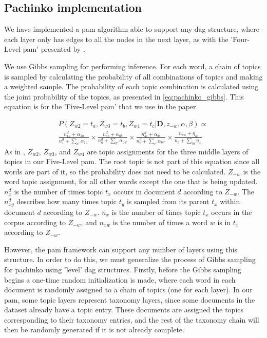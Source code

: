 \subsection{Pachinko implementation}
We have implemented a \acrfull{pam} algorithm able to support any \gls{dag} structure, where each layer only has edges to all the nodes in the next layer, as with the 'Four-Level \gls{pam}' presented by \citet{li2006pachinko}.

We use Gibbs sampling for performing inference.
For each word, a chain of topics is sampled by calculating the probability of all combinations of topics and making a weighted sample.
The probability of each topic combination is calculated using the joint probability of the topics, as presented in \autoref{eq:pachinko_gibbs}. This equation is for the 'Five-Level \gls{pam}' that we use in the paper.

\begin{equation}\label{eq:pachinko_gibbs}
	\begin{split}
		P(Z_{w2} = t_a, Z_{w3} = t_b, Z_{w4} = t_c | \textbf{D}, z_{-w}, \alpha, \beta) \propto \\
		\frac{n_{1a}^d + \alpha_{1a}}{n_1^d + \sum_{a'} \alpha_{1a'}} \times
		\frac{n_{ab}^d + \alpha_{ab}}{n_a^d + \sum_{b'} \alpha_{ab'}}  \times 
		\frac{n_{bc}^d + \alpha_{bc}}{n_{b}^d + \sum_{c'} \alpha_{bc'}} \times 
		\frac{n_{cw} + \eta_{w}}{n_{c} + \sum_{m} \eta_{m}} 
	\end{split}
\end{equation}
As in \citet{li2006pachinko}, $Z_{w2}$, $Z_{w3}$, and $Z_{w4}$ are topic assignments for the three middle layers of topics in our Five-Level \gls{pam}.
The root topic is not part of this equation since all words are part of it, so the probability does not need to be calculated.
$Z_{-w}$ is the word topic assignment, for all other words except the one that is being updated.
$n_x^d$ is the number of times topic $t_x$ occurs in document $d$ according to $Z_{-w}$. 
The $n_{xy}^d$ describes how many times topic $t_y$ is sampled from its parent $t_x$ within document $d$ according to $Z_{-w}$.
$n_x$ is the number of times topic $t_x$ occurs in the corpus according to $Z_{-w}$, and $n_{xw}$ is the number of times a word $w$ is in $t_x$ according to $Z_{-w}$.

However, the \gls{pam} framework can support any number of layers using this structure.
In order to do this, we must generalize the process of Gibbs sampling for pachinko using 'level' \gls{dag} structures.
Firstly, before the Gibbs sampling begins a one-time random initialization is made, where each word in each document is randomly assigned to a chain of topics (one for each layer).
In our \gls{pam}, some topic layers represent taxonomy layers, since some documents in the dataset already have a topic entry.
These documents are assigned the topics corresponding to their taxonomy entries, and the rest of the taxonomy chain will then be randomly generated if it is not already complete.

